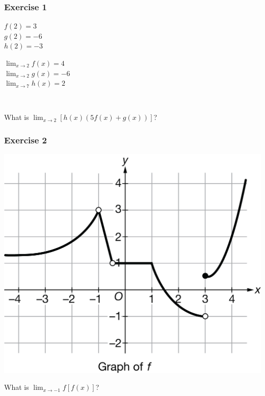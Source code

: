 \documentclass[12pt]{beamer}
\begin{document}
\begin{frame}
	\frametitle{Exercise 1}
	\vspace*{\fill}
	\vspace*{\fill}
	\initclock
	\large
	\begin{minipage}{0.5\textwidth}
		\begin{center}
			$f(2) = 3$\\
			$g(2) = -6$\\
			$h(2) = -3$
		\end{center}
	\end{minipage}%
	\begin{minipage}{0.5\textwidth}
		\begin{center}
			$\displaystyle\lim_{x\to2}f(x) = 4$\\
			$\displaystyle\lim_{x\to2}g(x) = -6$\\
			$\displaystyle\lim_{x\to7}h(x) = 2$
		\end{center}
	\end{minipage}\\
	\vspace*{\fill}
	\begin{center}
		What is $\displaystyle\lim_{x\to2}[h(x)(5f(x)+g(x))]$?\\
	\end{center}
	\vspace*{\fill}
	\vspace*{\fill}
	\crono
\end{frame}
\begin{frame}
	\frametitle{Exercise 2}
	\initclock
	\begin{center}
		\includegraphics[scale=0.5]{graph0913.png}
	\end{center}
	\large
	\begin{center}
		What is $\displaystyle\lim_{x\to-1}f[f(x)]$?\\
	\end{center}
	\crono
\end{frame}
\end{document}
